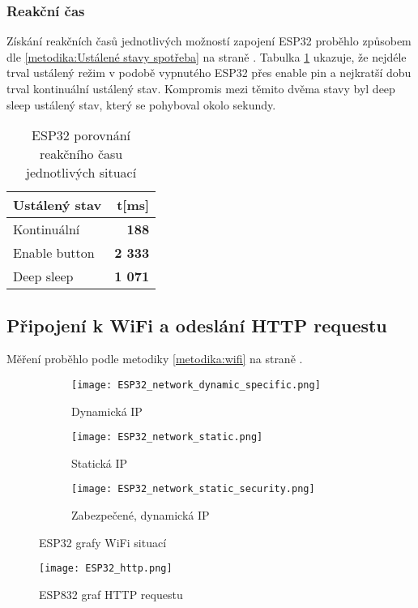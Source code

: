 \documentclass[a4paper, 12pt]{report}
\begin{document}
				\subsubsection{Reakční čas}
					Získání reakčních časů jednotlivých možností zapojení ESP32 proběhlo způsobem dle \ref{metodika:Ustálené stavy spotřeba} na straně \pageref{metodika:Ustálené stavy spotřeba}. Tabulka \ref{ESP32 klidové režimy čas} ukazuje, že nejdéle trval ustálený režim v podobě vypnutého ESP32 přes enable pin a nejkratší dobu trval kontinuální ustálený stav. Kompromis mezi těmito dvěma stavy byl deep sleep ustálený stav, který se pohyboval okolo sekundy.

					\begin{table}[h]
						\centering
						\caption{ESP32 porovnání reakčního času jednotlivých situací}
						\begin{tabular}{||l|r||}
							\hline
							Ustálený stav & t[ms] \\
							\hline
							Kontinuální & {\bf 188} \\
							Enable button & {\bf 2 333} \\
							Deep sleep & {\bf 1 071} \\
							\hline
						\end{tabular}
						\label{ESP32 klidové režimy čas}
					\end{table}

				\subsection{Připojení k WiFi a odeslání HTTP requestu}
				Měření proběhlo podle metodiky \ref{metodika:wifi} na straně \pageref{metodika:wifi}.
				\begin{figure}[h!]
					\centering
					\begin{subfigure}[b]{0.4\linewidth}
						\texttt{[image: ESP32\_network\_dynamic\_specific.png]}
						\caption{Dynamická IP}
					\end{subfigure}
					\begin{subfigure}[b]{0.4\linewidth}
						\texttt{[image: ESP32\_network\_static.png]}
						\caption{Statická IP}
					\end{subfigure}
					\begin{subfigure}[b]{0.4\linewidth}
						\texttt{[image: ESP32\_network\_static\_security.png]}
						\caption{Zabezpečené, dynamická IP}
					\end{subfigure}
					\caption{ESP32 grafy WiFi situací}
					\label{ESP32_network}
				\end{figure}
				\begin{figure}[h!]
					\centering
					\texttt{[image: ESP32\_http.png]}
					\caption{ESP832 graf HTTP requestu}
					\label{ESP32_http}
				\end{figure}
\end{document}
